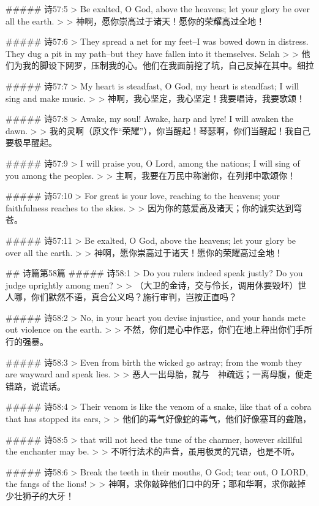 ##### 诗57:5
> Be exalted, O God, above the heavens; let your glory be over all the earth.
>
> 神啊，愿你崇高过于诸天！愿你的荣耀高过全地！


##### 诗57:6
> They spread a net for my feet--I was bowed down in distress. They dug a pit in my path--but they have fallen into it themselves. Selah
>
> 他们为我的脚设下网罗，压制我的心。他们在我面前挖了坑，自己反掉在其中。细拉


##### 诗57:7
> My heart is steadfast, O God, my heart is steadfast; I will sing and make music.
>
> 神啊，我心坚定，我心坚定！我要唱诗，我要歌颂！


##### 诗57:8
> Awake, my soul! Awake, harp and lyre! I will awaken the dawn.
>
> 我的灵啊（原文作“荣耀”），你当醒起！琴瑟啊，你们当醒起！我自己要极早醒起。


##### 诗57:9
> I will praise you, O Lord, among the nations; I will sing of you among the peoples.
>
> 主啊，我要在万民中称谢你，在列邦中歌颂你！


##### 诗57:10
> For great is your love, reaching to the heavens; your faithfulness reaches to the skies.
>
> 因为你的慈爱高及诸天；你的诚实达到穹苍。


##### 诗57:11
> Be exalted, O God, above the heavens; let your glory be over all the earth.
>
> 神啊，愿你崇高过于诸天！愿你的荣耀高过全地！


## 诗篇第58篇
##### 诗58:1
> Do you rulers indeed speak justly? Do you judge uprightly among men?
>
> （大卫的金诗，交与伶长，调用休要毁坏）世人哪，你们默然不语，真合公义吗？施行审判，岂按正直吗？


##### 诗58:2
> No, in your heart you devise injustice, and your hands mete out violence on the earth.
>
> 不然，你们是心中作恶，你们在地上秤出你们手所行的强暴。


##### 诗58:3
> Even from birth the wicked go astray; from the womb they are wayward and speak lies.
>
> 恶人一出母胎，就与　神疏远；一离母腹，便走错路，说谎话。


##### 诗58:4
> Their venom is like the venom of a snake, like that of a cobra that has stopped its ears,
>
> 他们的毒气好像蛇的毒气，他们好像塞耳的聋虺，


##### 诗58:5
> that will not heed the tune of the charmer, however skillful the enchanter may be.
>
> 不听行法术的声音，虽用极灵的咒语，也是不听。


##### 诗58:6
> Break the teeth in their mouths, O God; tear out, O LORD, the fangs of the lions!
>
> 神啊，求你敲碎他们口中的牙；耶和华啊，求你敲掉少壮狮子的大牙！


